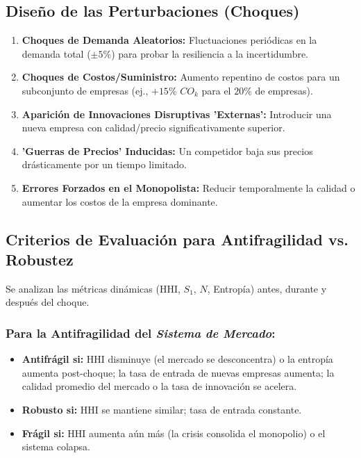 \documentclass{article}
\begin{document}
\subsection{Diseño de las Perturbaciones (Choques)}
\begin{enumerate}
    \item \textbf{Choques de Demanda Aleatorios:} Fluctuaciones periódicas en la demanda total ($\pm 5\%$) para probar la resiliencia a la incertidumbre.
    \item \textbf{Choques de Costos/Suministro:} Aumento repentino de costos para un subconjunto de empresas (ej., $+15\%$ $CO_k$ para el $20\%$ de empresas).
    \item \textbf{Aparición de Innovaciones Disruptivas 'Externas':} Introducir una nueva empresa con calidad/precio significativamente superior.
    \item \textbf{'Guerras de Precios' Inducidas:} Un competidor baja sus precios drásticamente por un tiempo limitado.
    \item \textbf{Errores Forzados en el Monopolista:} Reducir temporalmente la calidad o aumentar los costos de la empresa dominante.
\end{enumerate}

\subsection{Criterios de Evaluación para Antifragilidad vs. Robustez}
Se analizan las métricas dinámicas (HHI, $S_1$, $N$, Entropía) antes, durante y después del choque.

\subsubsection{Para la Antifragilidad del \textit{Sistema de Mercado}:}
\begin{itemize}
    \item \textbf{Antifrágil si:} HHI disminuye (el mercado se desconcentra) o la entropía aumenta post-choque; la tasa de entrada de nuevas empresas aumenta; la calidad promedio del mercado o la tasa de innovación se acelera.
    \item \textbf{Robusto si:} HHI se mantiene similar; tasa de entrada constante.
    \item \textbf{Frágil si:} HHI aumenta aún más (la crisis consolida el monopolio) o el sistema colapsa.
\end{itemize}
\end{document}
